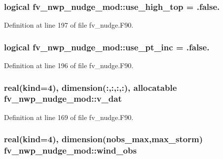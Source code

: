\subsubsection[{use\-\_\-high\-\_\-top}]{\setlength{\rightskip}{0pt plus 5cm}logical fv\-\_\-nwp\-\_\-nudge\-\_\-mod\-::use\-\_\-high\-\_\-top = .false.\hspace{0.3cm}{\ttfamily [private]}}\label{classfv__nwp__nudge__mod_a37a4cc7b60012b2fdafe49c5befb8a84}


Definition at line 197 of file fv\-\_\-nudge.\-F90.

\subsubsection[{use\-\_\-pt\-\_\-inc}]{\setlength{\rightskip}{0pt plus 5cm}logical fv\-\_\-nwp\-\_\-nudge\-\_\-mod\-::use\-\_\-pt\-\_\-inc = .false.\hspace{0.3cm}{\ttfamily [private]}}\label{classfv__nwp__nudge__mod_a1b4b58ec4a0172ebac02423ec390aec2}


Definition at line 196 of file fv\-\_\-nudge.\-F90.

\subsubsection[{v\-\_\-dat}]{\setlength{\rightskip}{0pt plus 5cm}real(kind=4), dimension(\-:,\-:,\-:,\-:), allocatable fv\-\_\-nwp\-\_\-nudge\-\_\-mod\-::v\-\_\-dat\hspace{0.3cm}{\ttfamily [private]}}\label{classfv__nwp__nudge__mod_a9d2249df35c01840bdff1c2f9b9f2af7}


Definition at line 169 of file fv\-\_\-nudge.\-F90.

\subsubsection[{wind\-\_\-obs}]{\setlength{\rightskip}{0pt plus 5cm}real(kind=4), dimension({\bf nobs\-\_\-max},{\bf max\-\_\-storm}) fv\-\_\-nwp\-\_\-nudge\-\_\-mod\-::wind\-\_\-obs\hspace{0.3cm}{\ttfamily [private]}}\label{classfv__nwp__nudge__mod_a0b13b44ac7609d8c641c306310649711}


